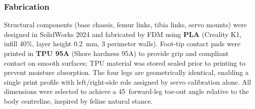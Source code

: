 \documentclass[journal]{IEEEtran}
\begin{document}
\subsubsection{Fabrication}
Structural components (base chassis, femur links, tibia links,
servo mounts) were designed in SolidWorks 2024 and fabricated
by FDM using \textbf{PLA} (Creality K1, infill 40\%,
layer height \SI{0.2}{\milli\metre}, 3 perimeter walls).
Foot-tip contact pads were printed in \textbf{TPU 95A}
(Shore hardness 95A) to provide grip and compliant contact on
smooth surfaces; TPU material was stored sealed prior to
printing to prevent moisture absorption.
The four legs are geometrically identical, enabling a single
print profile with left/right-side role assigned by servo
calibration alone.
All dimensions were selected to achieve a 45\textdegree\
forward-leg toe-out angle relative to the body centreline,
inspired by feline natural stance.
\end{document}
